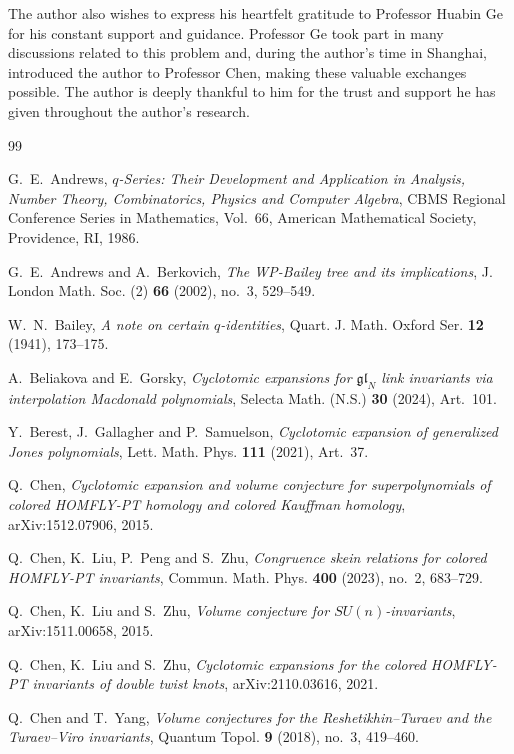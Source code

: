 \documentclass[11pt]{amsart}
\begin{document}
The author also wishes to express his heartfelt gratitude to Professor
Huabin Ge for his constant support and guidance. Professor Ge took part
in many discussions related to this problem and, during the author's
time in Shanghai, introduced the author to Professor Chen, making these
valuable exchanges possible. The author is deeply thankful to him for
the trust and support he has given throughout the author's research.

\begin{thebibliography}{99}

G.~E.~Andrews,
\emph{$q$-Series: Their Development and Application in Analysis,
Number Theory, Combinatorics, Physics and Computer Algebra},
CBMS Regional Conference Series in Mathematics, Vol.~66,
American Mathematical Society, Providence, RI, 1986.

G.~E.~Andrews and A.~Berkovich,
\emph{The WP-Bailey tree and its implications},
J. London Math. Soc. (2) \textbf{66} (2002), no.~3, 529--549.

W.~N.~Bailey,
\emph{A note on certain $q$-identities},
Quart. J. Math. Oxford Ser. \textbf{12} (1941), 173--175.

A.~Beliakova and E.~Gorsky,
\emph{Cyclotomic expansions for $\mathfrak{gl}_N$ link invariants via
interpolation Macdonald polynomials},
Selecta Math. (N.S.) \textbf{30} (2024), Art.~101.

Y.~Berest, J.~Gallagher and P.~Samuelson,
\emph{Cyclotomic expansion of generalized Jones polynomials},
Lett. Math. Phys. \textbf{111} (2021), Art.~37.

Q.~Chen,
\emph{Cyclotomic expansion and volume conjecture for superpolynomials
of colored HOMFLY-PT homology and colored Kauffman homology},
arXiv:1512.07906, 2015.

Q.~Chen, K.~Liu, P.~Peng and S.~Zhu,
\emph{Congruence skein relations for colored HOMFLY-PT invariants},
Commun. Math. Phys. \textbf{400} (2023), no.~2, 683--729.

Q.~Chen, K.~Liu and S.~Zhu,
\emph{Volume conjecture for $SU(n)$-invariants},
arXiv:1511.00658, 2015.

Q.~Chen, K.~Liu and S.~Zhu,
\emph{Cyclotomic expansions for the colored HOMFLY-PT invariants of
double twist knots},
arXiv:2110.03616, 2021.

Q.~Chen and T.~Yang,
\emph{Volume conjectures for the Reshetikhin--Turaev and the
Turaev--Viro invariants},
Quantum Topol. \textbf{9} (2018), no.~3, 419--460.


\end{thebibliography}
\end{document}
